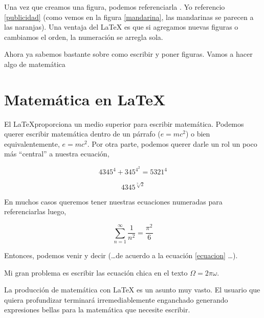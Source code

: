 \documentclass[12pt,a4paper]{article}
\begin{document}

Una vez que creamos una figura, podemos referenciarla . Yo referencio \ref{publicidad} (como vemos en la figura \ref{mandarina}, las mandarinas se parecen a las naranjas). Una ventaja del \LaTeX{} es que si agregamos nuevas figuras o cambiamos el orden, la numeración se arregla sola.

Ahora ya sabemos bastante sobre como escribir y poner figuras. Vamos a hacer algo de matemática

\clearpage  %

\section{Matem\'atica en \LaTeX{} }

El \LaTeX proporciona un medio superior para escribir matemática. Podemos querer escribir matemática dentro de un párrafo ($e=mc^{2}$) o bien equivalentemente, \begin{math} e = mc^{2} \end{math}. Por otra parte, podemos querer darle un rol un poco más ``central'' a nuestra ecuación, 

\begin{displaymath} 
4345^4 + 345^{4^2} = 5321^{4}
\end{displaymath}

\[4345^{\sqrt[3]{2}}\]

En muchos casos queremos tener nuestras ecuaciones numeradas para referenciarlas luego,

\begin{equation}
\label{ecuacion}
\sum_{n=1}^{\infty} \frac{1}{n^{2}} = \frac{\pi^{2}}{6}
\end{equation}

Entonces, podemos venir y decir (\ldots de acuerdo a la ecuación \ref{ecuacion} \ldots).

Mi gran problema es escribir las ecuación chica en el texto $\Omega = 2 \pi \omega$.

La producción de matemática con \LaTeX{} es un asunto muy vasto. El usuario que quiera profundizar terminará irremediablemente enganchado generando expresiones bellas para la matemática que necesite escribir. 
\end{document}
